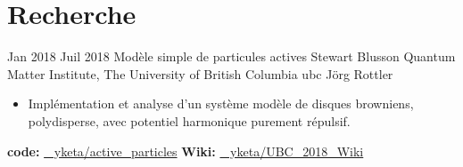 \documentclass[letterpaper]{cvtemplate_fr} %
\begin{document}
\makeprofile %


\section{Recherche}

\begin{cvbody}

\cvitem
	{Jan 2018}
	{Juil 2018}
	{Mod\`ele simple de particules actives}
  {Stewart Blusson Quantum Matter Institute, The University of British Columbia }
  {ubc}
  {J\"org Rottler}
  {\begin{itemize}
  \item Impl\'ementation et analyse d'un syst\`eme mod\`ele de disques browniens, polydisperse, avec potentiel harmonique purement r\'epulsif.\\
  \end{itemize}
  {\bf code:} \href{https://github.com/yketa/active_particles}{\faGithub~ yketa/active\_particles} \hfill {\bf Wiki:} \href{https://github.com/yketa/UBC_2018_Wiki}{\faGithub~ yketa/UBC\_2018\_Wiki}
  }
  \\


\end{cvbody}
\end{document}
